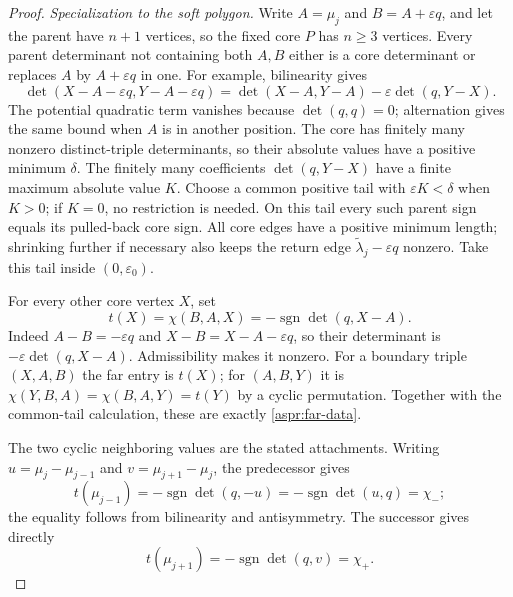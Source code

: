\begin{proof}
\emph{Specialization to the soft polygon.}
Write $A=\mu_j$ and $B=A+\varepsilon q$, and let the parent have
$n+1$ vertices, so the fixed core $P$ has $n\geq3$ vertices. Every
parent determinant not containing both $A,B$ either is a core
determinant or replaces $A$ by $A+\varepsilon q$ in one. For example,
bilinearity gives
\begin{equation}\label{aspr:det-clearance}
\det(X-A-\varepsilon q,Y-A-\varepsilon q)
=\det(X-A,Y-A)-\varepsilon\det(q,Y-X).
\end{equation}
The potential quadratic term vanishes because $\det(q,q)=0$;
alternation gives the same bound when $A$ is in another position.
The core has finitely many nonzero distinct-triple determinants, so
their absolute values have a positive minimum $\delta$. The finitely
many coefficients $\det(q,Y-X)$ have a finite maximum absolute value
$K$. Choose a common positive tail with $\varepsilon K<\delta$ when
$K>0$; if $K=0$, no restriction is needed. On this tail every such
parent sign equals its pulled-back core sign. All core edges have a
positive minimum length; shrinking further if necessary also keeps
the return edge $\widetilde\lambda_j-\varepsilon q$ nonzero. Take this
tail inside $(0,\varepsilon_0)$.

For every other core vertex $X$, set
\begin{equation}\label{aspr:geometric-t}
t(X)=\chi(B,A,X)=-\operatorname{sgn}\det(q,X-A).
\end{equation}
Indeed $A-B=-\varepsilon q$ and $X-B=X-A-\varepsilon q$, so their
determinant is $-\varepsilon\det(q,X-A)$. Admissibility makes it
nonzero. For a boundary triple $(X,A,B)$ the far entry is $t(X)$;
for $(A,B,Y)$ it is $\chi(Y,B,A)=\chi(B,A,Y)=t(Y)$ by a cyclic
permutation. Together with the common-tail calculation, these are
exactly \eqref{aspr:far-data}.

The two cyclic neighboring values are the stated attachments. Writing
$u=\mu_j-\mu_{j-1}$ and $v=\mu_{j+1}-\mu_j$, the predecessor gives
\begin{equation}\label{aspr:attachment-minus}
t(\mu_{j-1})=-\operatorname{sgn}\det(q,-u)
             =-\operatorname{sgn}\det(u,q)=\chi_-;
\end{equation}
the equality follows from bilinearity and antisymmetry. The successor
gives directly
\begin{equation}\label{aspr:attachment-plus}
t(\mu_{j+1})=-\operatorname{sgn}\det(q,v)=\chi_+.
\end{equation}


\end{proof}
